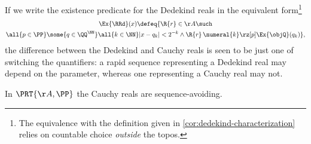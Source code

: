 If we write the existence predicate for the Dedekind reals in the equivalent form\footnote{The equivalence with the definition given in \cref{cor:dedekind-characterization} relies on countable choice \emph{outside} the topos.}
%
\begin{multline*}
  \Ex{\RRd}(x) \defeq
  \{\R{r} \in \AA \such \\
    \all{p \in \PP}
    \some{q \in \QQ^\NN}
    \all{k \in \NN}
    |x - q_k| < 2^{-k} \land
    \R{r} \, \numeral{k} \rz[p] \Ex{\objQ}(q_k)
  \},
\end{multline*}
%
the difference between the Dedekind and Cauchy reals is seen to be just one of switching the quantifiers:
a rapid sequence representing a Dedekind real may depend on the parameter, whereas one representing a Cauchy real may not.
\begin{theorem}
  \label{thm:cauchy-uncountable}%
  In $\PRT{\AA,\PP}$ the Cauchy reals are sequence-avoiding.
\end{theorem}

